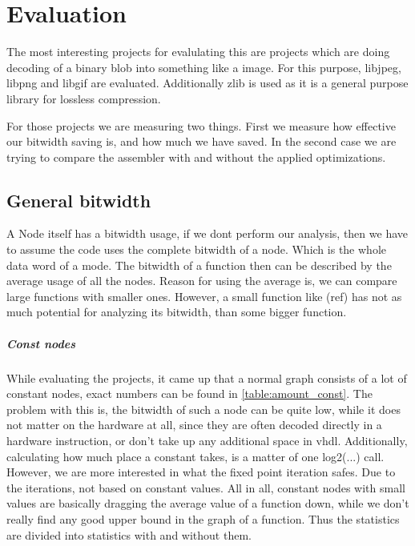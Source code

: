 \chapter{Evaluation}\label{sec:eval}

The most interesting projects for evalulating this are projects which are doing decoding of a binary blob into something like a image. For this purpose, libjpeg, libpng and libgif are evaluated. Additionally zlib is used as it is a general purpose library for lossless compression.

For those projects we are measuring two things. First we measure how effective our bitwidth saving is, and how much we have saved. In the second case we are trying to compare the assembler with and without the applied optimizations.

\section{General bitwidth}
A Node itself has a bitwidth usage, if we dont perform our analysis, then we have to assume the code uses the complete bitwidth of a node. Which is the whole data word of a mode.
The bitwidth of a function then can be described by the average usage of all the nodes. Reason for using the average is, we can compare large functions with smaller ones. However, a small function like (ref) has not as much potential for analyzing its bitwidth, than some bigger function.
\paragraph{Const nodes}

While evaluating the projects, it came up that a normal graph consists of a lot of constant nodes, exact numbers can be found in \autoref{table:amount_const}. The problem with this is, the bitwidth of such a node can be quite low, while it does not matter on the hardware at all, since they are often decoded directly in a hardware instruction, or don't take up any additional space in vhdl. Additionally, calculating how much place a constant takes, is a matter of one log2(...) call. However, we are more interested in what the fixed point iteration safes. Due to the iterations, not based on constant values.
All in all, constant nodes with small values are basically dragging the average value of a function down, while we don't really find any good upper bound in the graph of a function.
Thus the statistics are divided into statistics with and without them.

